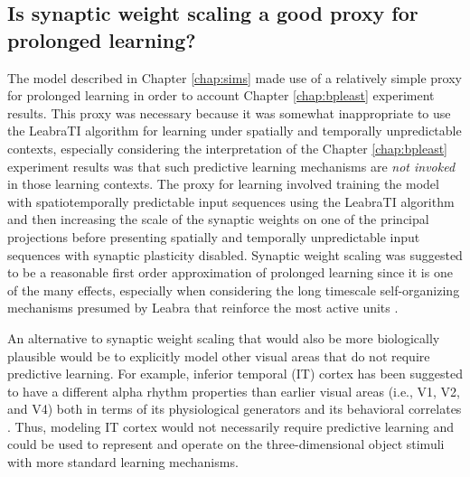 \documentclass[dwyatte_dissertation.tex]{subfiles}
\begin{document}

\subsection{Is synaptic weight scaling a good proxy for prolonged learning?} 

The model described in Chapter \ref{chap:sims} made use of a relatively simple proxy for prolonged learning in order to account Chapter \ref{chap:bpleast} experiment results. This proxy was necessary because it was somewhat inappropriate to use the LeabraTI algorithm for learning under spatially and temporally unpredictable contexts, especially considering the interpretation of the Chapter \ref{chap:bpleast} experiment results was that such predictive learning mechanisms are \textit{not invoked} in those learning contexts. The proxy for learning involved training the model with spatiotemporally predictable input sequences using the LeabraTI algorithm and then increasing the scale of the synaptic weights on one of the principal projections before presenting spatially and temporally unpredictable input sequences with synaptic plasticity disabled. Synaptic weight scaling was suggested to be a reasonable first order approximation of prolonged learning since it is one of the many effects, especially when considering the long timescale self-organizing mechanisms presumed by Leabra that reinforce the most active units \cite{OReillyMunakata00,OReillyMunakataFrankEtAl12}.

An alternative to synaptic weight scaling that would also be more biologically plausible would be to explicitly model other visual areas that do not require predictive learning. For example, inferior temporal (IT) cortex has been suggested to have a different alpha rhythm properties than earlier visual areas (i.e., V1, V2, and V4) both in terms of its physiological generators and its behavioral correlates \cite{BollimuntaChenSchroederEtAl08}. Thus, modeling IT cortex would not necessarily require predictive learning and could be used to represent and operate on the three-dimensional object stimuli with more standard learning mechanisms. 
\end{document}
